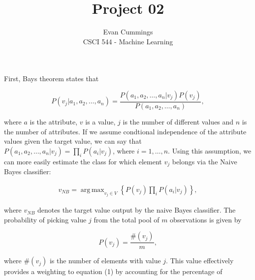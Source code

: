 
\DeclareMathOperator*{\argmax}{arg\,max}


\small

\title{Project 02}
\author{Evan Cummings\\
CSCI 544 - Machine Learning}

\maketitle

First, Bays theorem states that

$$ P(v_j | a_1, a_2, \ldots, a_n) = \frac{P(a_1, a_2, \ldots, a_n | v_j) P(v_j)}{P(a_1,a_2,\ldots,a_n)},$$

where $a$ is the attribute, $v$ is a value, $j$ is the number of different values and $n$ is the number of attributes.  If we assume condtional independence of the attribute values given the target value, we can say that $P(a_1, a_2, \ldots, a_n | v_j) = \prod_i P(a_i | v_j)$, where $i = 1,\ldots,n$.  Using this assumption, we can more easily estimate the class for which element $v_j$ belongs via the Naive Bayes classifier:

\begin{align}
  v_{NB} = \argmax_{v_j \in V}\left\{ P(v_j) \prod_i P(a_i | v_j) \right\},
\end{align}

where $v_{NB}$ denotes the target value output by the naive Bayes classifier.  The probability of picking value $j$ from the total pool of $m$ observations is given by

$$ P(v_j) = \frac{\#(v_j)}{m},$$

where $\#(v_j)$ is the number of elements with value $j$.  This value effectively provides a weighting to equation (1) by accounting for the percentage of 

\newpage

